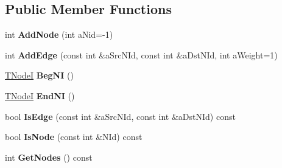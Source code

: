 \subsection*{Public Member Functions}
\begin{DoxyCompactItemize}
\item 
\hypertarget{classall__distance__sketch_1_1graph_1_1GenericGraphAdaptor_af7b951faaeb659f3c587cedbf4f5cad3}{}int {\bfseries Add\+Node} (int a\+Nid=-\/1)\label{classall__distance__sketch_1_1graph_1_1GenericGraphAdaptor_af7b951faaeb659f3c587cedbf4f5cad3}

\item 
\hypertarget{classall__distance__sketch_1_1graph_1_1GenericGraphAdaptor_adccc42f362c3d872fa0caba907c1d326}{}int {\bfseries Add\+Edge} (const int \&a\+Src\+N\+Id, const int \&a\+Dst\+N\+Id, int a\+Weight=1)\label{classall__distance__sketch_1_1graph_1_1GenericGraphAdaptor_adccc42f362c3d872fa0caba907c1d326}

\item 
\hypertarget{classall__distance__sketch_1_1graph_1_1GenericGraphAdaptor_a8256878555ccf60d68814d27f4c1897d}{}\hyperlink{classall__distance__sketch_1_1graph_1_1GenericGraphAdaptor_1_1GenericIterator}{T\+Node\+I} {\bfseries Beg\+N\+I} ()\label{classall__distance__sketch_1_1graph_1_1GenericGraphAdaptor_a8256878555ccf60d68814d27f4c1897d}

\item 
\hypertarget{classall__distance__sketch_1_1graph_1_1GenericGraphAdaptor_a607e1ebb6daf1b343c8fd53c15b27814}{}\hyperlink{classall__distance__sketch_1_1graph_1_1GenericGraphAdaptor_1_1GenericIterator}{T\+Node\+I} {\bfseries End\+N\+I} ()\label{classall__distance__sketch_1_1graph_1_1GenericGraphAdaptor_a607e1ebb6daf1b343c8fd53c15b27814}

\item 
\hypertarget{classall__distance__sketch_1_1graph_1_1GenericGraphAdaptor_a7b7480202de98282668c5bb6925c9f72}{}bool {\bfseries Is\+Edge} (const int \&a\+Src\+N\+Id, const int \&a\+Dst\+N\+Id) const \label{classall__distance__sketch_1_1graph_1_1GenericGraphAdaptor_a7b7480202de98282668c5bb6925c9f72}

\item 
\hypertarget{classall__distance__sketch_1_1graph_1_1GenericGraphAdaptor_ae205c8605124f2cd15d677b81af97f12}{}bool {\bfseries Is\+Node} (const int \&N\+Id) const \label{classall__distance__sketch_1_1graph_1_1GenericGraphAdaptor_ae205c8605124f2cd15d677b81af97f12}

\item 
\hypertarget{classall__distance__sketch_1_1graph_1_1GenericGraphAdaptor_a7d0a796bc2a5b4202272ae0abecd5a15}{}int {\bfseries Get\+Nodes} () const \label{classall__distance__sketch_1_1graph_1_1GenericGraphAdaptor_a7d0a796bc2a5b4202272ae0abecd5a15}


\end{DoxyCompactItemize}

